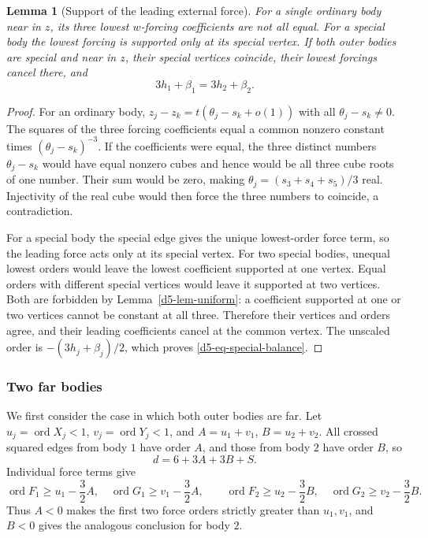 \documentclass[11pt]{amsart}
\newtheorem{lemma}[theorem]{Lemma}
\theoremstyle{definition}
\theoremstyle{remark}
\newcommand{\ord}{\operatorname{ord}}
\begin{document}
{\begin{lemma}[Support of the leading external force]\label{d5-lem-support}
For a single ordinary body near in $z$, its three lowest $w$-forcing coefficients
are not all equal.  For a special body the lowest forcing is supported only at
its special vertex.  If both outer bodies are special and near in $z$, their
special vertices coincide, their lowest forcings cancel there, and
\begin{equation}\label{d5-eq-special-balance}
 3h_1+\beta_1=3h_2+\beta_2.
\end{equation}
\end{lemma}
\begin{proof}
For an ordinary body,
$z_j-z_k=t(\theta_j-s_k+o(1))$ with all $\theta_j-s_k\ne0$.
The squares of the three forcing coefficients equal a common nonzero constant times
$(\theta_j-s_k)^{-3}$.  If the coefficients were equal, the three distinct
numbers $\theta_j-s_k$ would have equal nonzero cubes and hence would be all
three cube roots of one number.  Their sum would be zero, making
$\theta_j=(s_3+s_4+s_5)/3$ real.  Injectivity of the real cube would then force
the three numbers to coincide, a contradiction.

For a special body the special edge gives the unique lowest-order force
term, so the leading force acts only at its special vertex.
For two special bodies, unequal lowest orders would leave the lowest coefficient
supported at one vertex.  Equal orders with different special vertices would
leave it supported at two vertices.  Both are forbidden by
Lemma~\ref{d5-lem-uniform}: a coefficient supported at one or two vertices
cannot be constant at all three.  Therefore their vertices and orders agree,
and their leading coefficients cancel at the common vertex.  The unscaled order is
$-(3h_j+\beta_j)/2$, which proves \eqref{d5-eq-special-balance}.
\end{proof}

\subsubsection{Two far bodies}\label{d5-far-far}
We first consider the case in which both outer bodies are far.
Let $u_j=\ord X_j<1$, $v_j=\ord Y_j<1$, and
$A=u_1+v_1$, $B=u_2+v_2$.  All crossed squared edges from body $1$ have order
$A$, and those from body $2$ have order $B$, so
\begin{equation}\label{d5-eq-far-product}
 d=6+3A+3B+S.
\end{equation}
Individual force terms give
\[
 \ord F_1\ge u_1-\frac32A,\quad \ord G_1\ge v_1-\frac32A,
 \qquad
 \ord F_2\ge u_2-\frac32B,\quad \ord G_2\ge v_2-\frac32B.
\]
Thus $A<0$ makes the first two force orders strictly greater than $u_1,v_1$,
and $B<0$ gives the analogous conclusion for body $2$.

}
\end{document}
